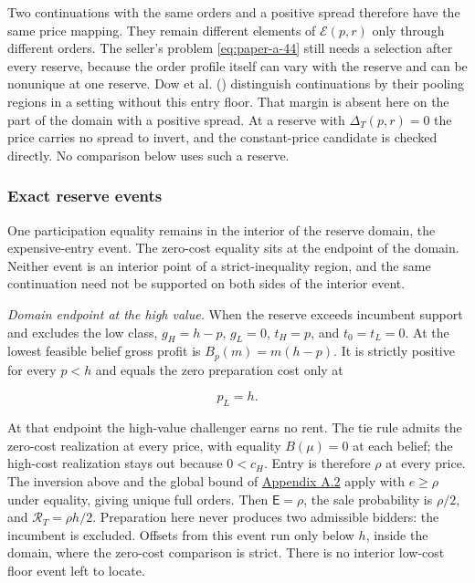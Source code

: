 Two continuations with the same orders and a positive spread therefore have the
same price mapping. They remain different elements of \(\mathcal E(p,r)\) only
through different orders. The seller's problem \eqref{eq:paper-a-44} still needs
a selection after every reserve, because the order profile itself can vary with
the reserve and can be nonunique at one reserve.
Dow et al. () distinguish
continuations by their pooling regions in a setting without this entry floor.
That margin is absent here on the part of the domain with a positive spread.
At a reserve with \(\Delta_T(p,r)=0\) the price carries no spread to invert, and
the constant-price candidate is checked directly. No comparison below uses such
a reserve.

\subsubsection{Exact reserve events}\label{exact-reserve-events}

One participation equality remains in the interior of the reserve domain, the
expensive-entry event. The zero-cost equality sits at the endpoint of the
domain. Neither event is an interior point of a strict-inequality region, and
the same continuation need not be supported on both sides of the interior event.

\emph{Domain endpoint at the high value.} When the reserve exceeds incumbent support
and excludes the low class, \(g_H=h-p\), \(g_L=0\), \(t_H=p\), and
\(t_0=t_L=0\). At the lowest feasible belief gross profit is \(B_p(m)=m(h-p)\).
It is strictly positive for every \(p<h\) and equals the zero preparation cost only at

\[
p_L=h.
\tag{A.50}\label{eq:paper-a-50}
\]

At that endpoint the high-value challenger earns no rent. The tie rule admits
the zero-cost realization at every price, with equality \(B(\mu)=0\) at each
belief; the high-cost realization stays out because \(0<c_H\).
Entry is therefore \(\rho\) at every price. The inversion above and the global
bound of \hyperref[pa-proofs]{Appendix A.2} apply with \(e\ge\rho\) under
equality, giving unique full orders. Then \(\mathsf E=\rho\), the sale
probability is \(\rho/2\), and \(\mathcal R_T=\rho h/2\). Preparation
here never produces two admissible bidders: the incumbent is excluded.
Offsets from this event run only below \(h\), inside the domain, where the
zero-cost comparison is strict. There is no interior low-cost floor event left
to locate.


